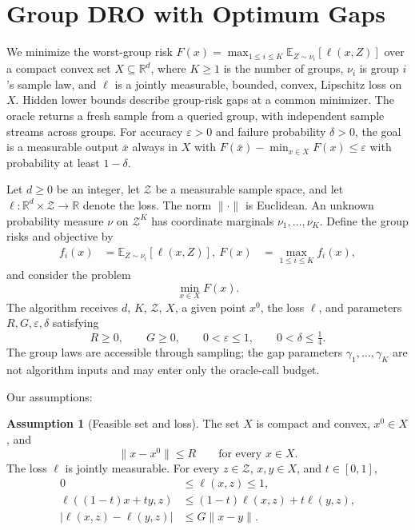 \documentclass[10pt]{article}
\theoremstyle{definition}
\newtheorem{assumption}{Assumption}
\begin{document}
\section*{Group DRO with Optimum Gaps}
We minimize the worst-group risk $F(x)=\max_{1\leq i\leq K}\mathbb{E}_{Z\sim\nu_i}[\ell(x,Z)]$ over a compact convex set $X\subseteq\mathbb{R}^d$, where $K\geq1$ is the number of groups, $\nu_i$ is group $i$'s sample law, and $\ell$ is a jointly measurable, bounded, convex, Lipschitz loss on $X$. Hidden lower bounds describe group-risk gaps at a common minimizer. The oracle returns a fresh sample from a queried group, with independent sample streams across groups. For accuracy $\varepsilon>0$ and failure probability $\delta>0$, the goal is a measurable output $\bar{x}$ always in $X$ with $F(\bar{x})-\min_{x\in X}F(x)\leq\varepsilon$ with probability at least $1-\delta$.

Let $d\geq0$ be an integer, let $\mathcal{Z}$ be a measurable sample space, and let $\ell:\mathbb{R}^d\times\mathcal{Z}\to\mathbb{R}$ denote the loss. The norm $\|\cdot\|$ is Euclidean. An unknown probability measure $\nu$ on $\mathcal{Z}^K$ has coordinate marginals $\nu_1,\ldots,\nu_K$. Define the group risks and objective by
\[
\begin{aligned}
f_i(x)&=\mathbb{E}_{Z\sim\nu_i}[\ell(x,Z)],\
F(x)&=\max_{1\leq i\leq K}f_i(x),
\end{aligned}
\]
and consider the problem
\[
\min_{x\in X} F(x).
\]
The algorithm receives $d$, $K$, $\mathcal{Z}$, $X$, a given point $x^0$, the loss $\ell$, and parameters $R,G,\varepsilon,\delta$ satisfying
\[
R\geq0,\qquad G\geq0,\qquad
0<\varepsilon\leq1,\qquad 0<\delta\leq\tfrac14.
\]
The group laws are accessible through sampling; the gap parameters $\gamma_1,\ldots,\gamma_K$ are not algorithm inputs and may enter only the oracle-call budget.

Our assumptions:
\begin{assumption}[Feasible set and loss]
The set $X$ is compact and convex, $x^0\in X$, and
\[
\|x-x^0\|\leq R\qquad\text{for every }x\in X.
\]
The loss $\ell$ is jointly measurable. For every $z\in\mathcal{Z}$, $x,y\in X$, and $t\in[0,1]$,
\[
\begin{aligned}
0&\leq\ell(x,z)\leq1,\\
\ell((1-t)x+ty,z)&\leq(1-t)\ell(x,z)+t\ell(y,z),\\
|\ell(x,z)-\ell(y,z)|&\leq G\|x-y\|.
\end{aligned}
\]
\end{assumption}
\end{document}
